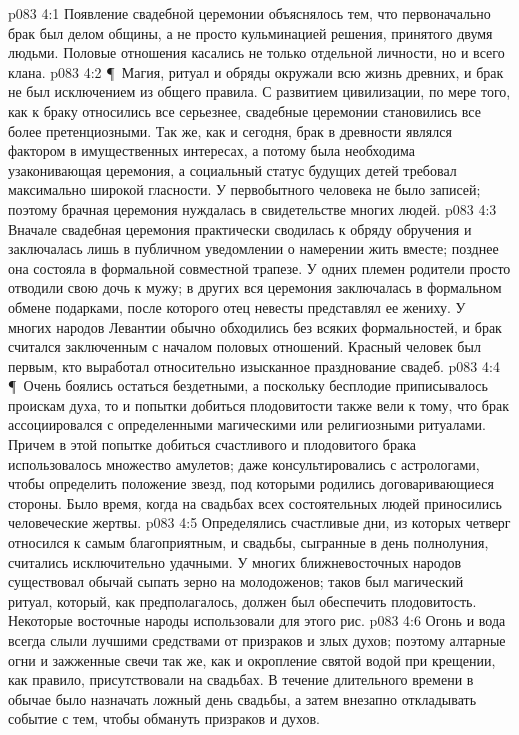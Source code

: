 \vs p083 4:1 Появление свадебной церемонии объяснялось тем, что первоначально брак был делом общины, а не просто кульминацией решения, принятого двумя людьми. Половые отношения касались не только отдельной личности, но и всего клана.
\vs p083 4:2 \P\ Магия, ритуал и обряды окружали всю жизнь древних, и брак не был исключением из общего правила. С развитием цивилизации, по мере того, как к браку относились все серьезнее, свадебные церемонии становились все более претенциозными. Так же, как и сегодня, брак в древности являлся фактором в имущественных интересах, а потому была необходима узаконивающая церемония, а социальный статус будущих детей требовал максимально широкой гласности. У первобытного человека не было записей; поэтому брачная церемония нуждалась в свидетельстве многих людей.
\vs p083 4:3 Вначале свадебная церемония практически сводилась к обряду обручения и заключалась лишь в публичном уведомлении о намерении жить вместе; позднее она состояла в формальной совместной трапезе. У одних племен родители просто отводили свою дочь к мужу; в других вся церемония заключалась в формальном обмене подарками, после которого отец невесты представлял ее жениху. У многих народов Левантии обычно обходились без всяких формальностей, и брак считался заключенным с началом половых отношений. Красный человек был первым, кто выработал относительно изысканное празднование свадеб.
\vs p083 4:4 \P\ Очень боялись остаться бездетными, а поскольку бесплодие приписывалось проискам духа, то и попытки добиться плодовитости также вели к тому, что брак ассоциировался с определенными магическими или религиозными ритуалами. Причем в этой попытке добиться счастливого и плодовитого брака использовалось множество амулетов; даже консультировались с астрологами, чтобы определить положение звезд, под которыми родились договаривающиеся стороны. Было время, когда на свадьбах всех состоятельных людей приносились человеческие жертвы.
\vs p083 4:5 Определялись счастливые дни, из которых четверг относился к самым благоприятным, и свадьбы, сыгранные в день полнолуния, считались исключительно удачными. У многих ближневосточных народов существовал обычай сыпать зерно на молодоженов; таков был магический ритуал, который, как предполагалось, должен был обеспечить плодовитость. Некоторые восточные народы использовали для этого рис.
\vs p083 4:6 Огонь и вода всегда слыли лучшими средствами от призраков и злых духов; поэтому алтарные огни и зажженные свечи так же, как и окропление святой водой при крещении, как правило, присутствовали на свадьбах. В течение длительного времени в обычае было назначать ложный день свадьбы, а затем внезапно откладывать событие с тем, чтобы обмануть призраков и духов.
